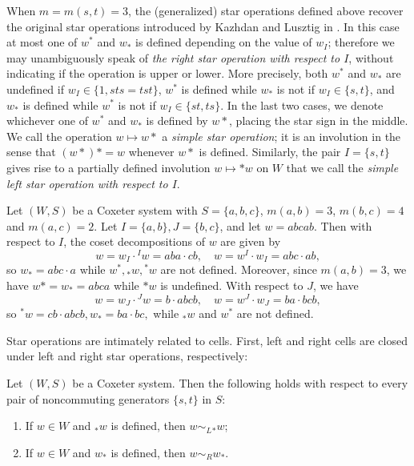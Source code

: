 When $m=m(s,t)=3$, the (generalized) star operations defined above recover the original star operations introduced
by Kazhdan and Lusztig in \cite{KL}. In this case at most one of $w^*$ and $w_*$ is defined depending on the value
of $w_I$; therefore we may unambiguously speak of \emph{the right star operation with respect to $I$}, without
indicating if the operation is upper or lower. More precisely, both $w^*$ and $w_*$ are undefined if $w_I\in
\{1,sts=tst\}$, $w^*$ is defined while $w_*$ is not if $w_I\in\{s,t\}$, and $w_*$ is defined while $w^*$ is not if
$w_I\in \{st,ts\}$. In the last two cases, we denote whichever one of $w^*$ and $w_*$ is
defined by $w*$,
placing the star sign in the middle. We call the operation $w\mapsto w*$ a \emph{simple star operation}; it is an
involution in the sense that $(w*)*=w$ whenever $w*$ is defined. Similarly, the pair $I=\{s,t\}$ gives rise to a
partially defined involution $w\mapsto *w$ on $W$ that we call the \emph{simple left star operation with respect to
$I$}.

\begin{example}
    \label{eg:StarOperation} 
    Let $(W,S)$ be a Coxeter system with $S=\{a,b,c\}$, $m(a,b)=3$, $m(b,c)=4$ and $m(a,c)=2$. Let $I=\{a,b\},
    J=\{b,c\}$, and let $w=abcab$. Then with respect to $I$, the coset decompositions of $w$ are given by \[ w=
    w_I\cdot {}^I w= aba\cdot cb, \quad w= w^I \cdot w_I = abc\cdot ab, \] so $w_*=abc\cdot a$ while $w^*,
    {}_* w, {}^* w$ are not defined.  Moreover, since $m(a,b)=3$, we have $w*=w_*=abca$ while $*w$ is undefined.
    With respect to $J$, we have \[ w=w_J\cdot {}^J w=b\cdot abcb, \quad w=w^J\cdot w_J=ba\cdot bcb,
    \] so
    ${}^{*}w=cb\cdot abcb, w_*=ba\cdot bc,$ while ${}_*w$ and $w^*$ are not defined.  
\end{example}

Star operations are intimately related to \kl cells. First, left and right cells are closed under left and right
star operations, respectively: 
\begin{prop}
    \label{prop:StarOpAndCells} 
    Let $(W,S)$ be a Coxeter system. Then the following holds with respect to every pair of noncommuting generators
    $\{s,t\}$ in  $S$:
    \begin{enumerate}
        \item  If $w\in W$ and ${}_* w$ is defined, then $w\sim_L {}_* w$;
        \item  If $w\in W$ and $w_*$ is defined, then $w\sim_R w_*$.
    \end{enumerate}
\end{prop}

